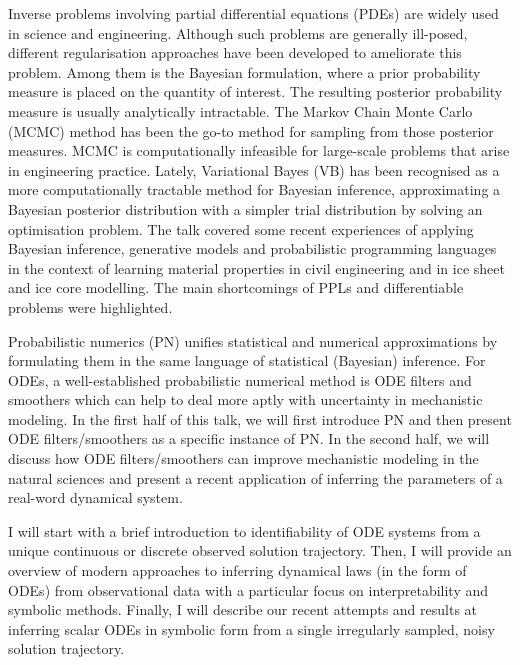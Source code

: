 Inverse problems involving partial differential equations (PDEs) are widely used in science and engineering. Although such problems are generally ill-posed, different regularisation approaches have been developed to ameliorate this problem. Among them is the Bayesian formulation, where a prior probability measure is placed on the quantity of interest. The resulting posterior probability measure is usually analytically intractable. The Markov Chain Monte Carlo (MCMC) method has been the go-to method for sampling from those posterior measures. MCMC is computationally infeasible for large-scale problems that arise in engineering practice. Lately, Variational Bayes (VB) has been recognised as a more computationally tractable method for Bayesian inference, approximating a Bayesian posterior distribution with a simpler trial distribution by solving an optimisation problem. The talk covered some recent experiences of applying Bayesian inference, generative models and probabilistic programming languages in the context of learning material properties in civil engineering and in ice sheet and ice core modelling. The main shortcomings of PPLs and differentiable problems were highlighted.

\license

Probabilistic numerics (PN) unifies statistical and numerical approximations by formulating them in the same language of statistical (Bayesian) inference. For ODEs, a well-established probabilistic numerical method is ODE filters and smoothers which can help to deal more aptly with uncertainty in mechanistic modeling. In the first half of this talk, we will first introduce PN and then present ODE filters/smoothers as a specific instance of PN. In the second half, we will discuss how ODE filters/smoothers can improve mechanistic modeling in the natural sciences and present a recent application of inferring the parameters of a real-word dynamical system.

\license

I will start with a brief introduction to identifiability of ODE systems from a unique continuous or discrete observed solution trajectory. Then, I will provide an overview of modern approaches to inferring dynamical laws (in the form of ODEs) from observational data with a particular focus on interpretability and symbolic methods. Finally, I will describe our recent attempts and results at inferring scalar ODEs in symbolic form from a single irregularly sampled, noisy solution trajectory.

